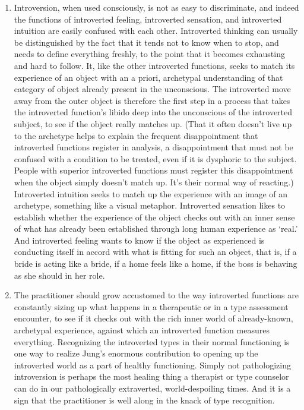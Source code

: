 \begin{enumerate}
\item {} Introversion,
when used consciously, is not as easy to discriminate, and indeed the functions
of introverted feeling, introverted sensation, and introverted intuition are
easily confused with each other. Introverted thinking can usually be
distinguished by the fact that it tends not to know when to stop, and needs to
define everything freshly, to the point that it becomes exhausting and hard to
follow. It, like the other introverted functions, seeks to match its experience
of an object with an a priori, archetypal understanding of that category of
object already present in the unconscious. The introverted move away from the
outer object is therefore the first step in a process that takes the
introverted function’s libido deep into the unconscious of the introverted
subject, to see if the object really matches up. (That it often doesn’t live up
to the archetype helps to explain the frequent disappointment that introverted
functions register in analysis, a disappointment that must not be confused with
a condition to be treated, even if it is dysphoric to the subject. People with
superior introverted functions must register this disappointment when the
object simply doesn’t match up. It’s their normal way of reacting.) Introverted
intuition seeks to match up the experience with an image of an archetype,
something like a visual metaphor. Introverted sensation likes to establish
whether the experience of the object checks out with an inner sense of what has
already been established through long human experience as ‘real.’ And
introverted feeling wants to know if the object as experienced is conducting
itself in accord with what is fitting for such an object, that is, if a bride
is acting like a bride, if a home feels like a home, if the boss is behaving as
she should in her role.

\item {} The practitioner
should grow accustomed to the way introverted functions are constantly sizing
up what happens in a therapeutic or in a type assessment encounter, to see if
it checks out with the rich inner world of already-known, archetypal
experience, against which an introverted function measures everything.
Recognizing the introverted types in their normal functioning is one way to
realize Jung’s enormous contribution to opening up the introverted world as a
part of healthy functioning. Simply not pathologizing introversion is perhaps
the most healing thing a therapist or type counselor can do in our
pathologically extraverted, world-despoiling times. And it is a sign that the
practitioner is well along in the knack of type recognition.

\end{enumerate}
